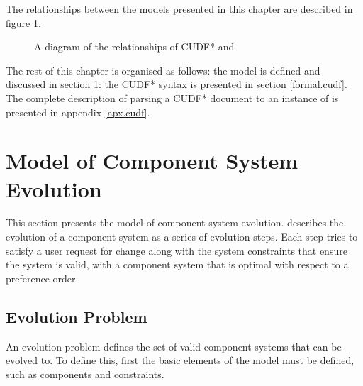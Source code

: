 The relationships between the models presented in this chapter are described in figure \ref{formal.modeldiagram}.
\begin{figure}[htp]
\begin{center}
  \caption{A diagram of the relationships of CUDF* and \modelname}
  \label{formal.modeldiagram}
\end{center}
\end{figure}

The rest of this chapter is organised as follows:
the \modelname model is defined and discussed in section \ref{formal.step}:
the CUDF* syntax is presented in section \ref{formal.cudf}.
The complete description of parsing a CUDF* document to an instance of \modelname is presented in appendix \ref{apx.cudf}.
 
\section{\modelname Model of Component System Evolution}
\label{formal.step}
This section presents the \modelname model of component system evolution. 
\modelname describes the evolution of a component system as a series of evolution steps.
Each step tries to satisfy a user request for change along with the system constraints that ensure the system is valid,
with a component system that is optimal with respect to a preference order.


\subsection{Evolution Problem}
An evolution problem defines the set of valid component systems that can be evolved to.
To define this, first the basic elements of the model must be defined, such as components and constraints. 

